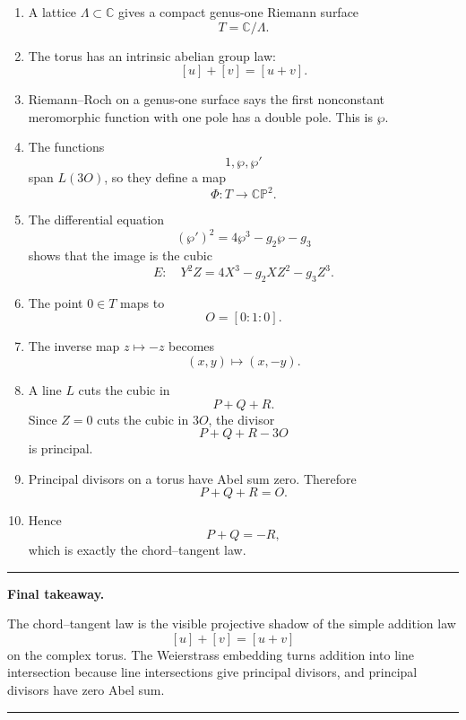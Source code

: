 \documentclass[11pt]{article}
\newcommand{\C}{\mathbb{C}}
\newcommand{\CP}{\mathbb{CP}}
\newenvironment{keyidea}[1]{%
  \par\medskip
  \begin{center}
  \begin{minipage}{0.92\textwidth}
  \hrule
  \smallskip
  \textbf{#1.}\quad\ignorespaces
}{%
  \smallskip
  \hrule
  \end{minipage}
  \end{center}
  \medskip
}
\begin{document}
\begin{enumerate}
\item A lattice \(\Lambda\subset\C\) gives a compact genus-one Riemann
surface
\[
T=\C/\Lambda.
\]

\item The torus has an intrinsic abelian group law:
\[
[u]+[v]=[u+v].
\]

\item Riemann--Roch on a genus-one surface says the first nonconstant
meromorphic function with one pole has a double pole.  This is \(\wp\).

\item The functions
\[
1,\wp,\wp'
\]
span \(L(3O)\), so they define a map
\[
\Phi:T\to\CP^2.
\]

\item The differential equation
\[
(\wp')^2=4\wp^3-g_2\wp-g_3
\]
shows that the image is the cubic
\[
E:\quad Y^2Z=4X^3-g_2XZ^2-g_3Z^3.
\]

\item The point \(0\in T\) maps to
\[
O=[0:1:0].
\]

\item The inverse map \(z\mapsto -z\) becomes
\[
(x,y)\mapsto(x,-y).
\]

\item A line \(L\) cuts the cubic in
\[
P+Q+R.
\]
Since \(Z=0\) cuts the cubic in \(3O\), the divisor
\[
P+Q+R-3O
\]
is principal.

\item Principal divisors on a torus have Abel sum zero.  Therefore
\[
P+Q+R=O.
\]

\item Hence
\[
P+Q=-R,
\]
which is exactly the chord--tangent law.
\end{enumerate}

\begin{keyidea}{Final takeaway}
The chord--tangent law is the visible projective shadow of the simple
addition law
\[
[u]+[v]=[u+v]
\]
on the complex torus.  The Weierstrass embedding turns addition into line
intersection because line intersections give principal divisors, and
principal divisors have zero Abel sum.
\end{keyidea}
\end{document}
